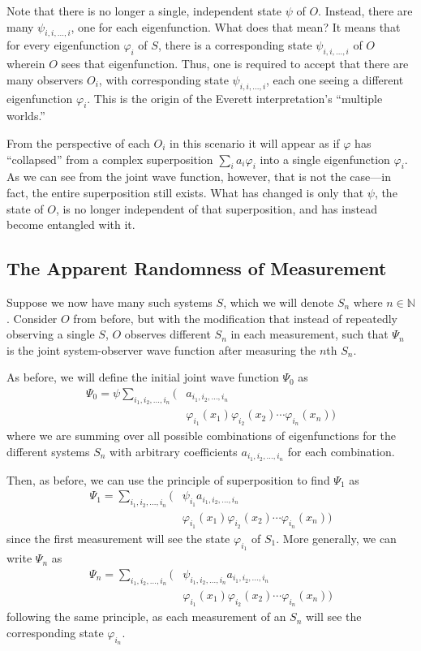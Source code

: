 \documentclass[
    12pt,
    letterpaper,
    aps,
    prd,
    longbibliography,
    twocolumn,
    nofootinbib,
    raggedbottom,
    amsmath,
    amssymb,
    amsfonts,
]{revtex4-1}
\newcommand{\mbb}[1]{\mathbb{#1}}
\renewcommand{\phi}{\varphi}
\begin{document}
Note that there is no longer a single, independent state $\psi$ of $O$. Instead, there are many $\psi_{i,i,\ldots,i}$, one for each eigenfunction. What does that mean? It means that for every eigenfunction $\phi_i$ of $S$, there is a corresponding state $\psi_{i,i,\ldots,i}$ of $O$ wherein $O$ sees that eigenfunction. Thus, one is required to accept that there are many observers $O_i$, with corresponding state $\psi_{i,i,\ldots,i}$, each one seeing a different eigenfunction $\phi_i$. This is the origin of the Everett interpretation's ``multiple worlds.''

From the perspective of each $O_i$ in this scenario it will appear as if $\phi$ has ``collapsed'' from a complex superposition $\sum_i a_i \phi_i$ into a single eigenfunction $\phi_i$. As we can see from the joint wave function, however, that is not the case---in fact, the entire superposition still exists. What has changed is only that $\psi$, the state of $O$, is no longer independent of that superposition, and has instead become entangled with it.

\subsection{The Apparent Randomness of Measurement}

Suppose we now have many such systems $S$, which we will denote $S_n$ where $n \in \mbb N$. Consider $O$ from before, but with the modification that instead of repeatedly observing a single $S$, $O$ observes different $S_n$ in each measurement, such that $\Psi_n$ is the joint system-observer wave function after measuring the $n$th $S_n$.

As before, we will define the initial joint wave function $\Psi_0$ as
\begin{align*}
    \Psi_0 = \psi \sum_{i_1, i_2, \ldots, i_n}\big( & a_{i_1, i_2, \ldots, i_n} \\
    & \phi_{i_1}(x_1) \phi_{i_2}(x_2) \cdots \phi_{i_n}(x_n) \big)
\end{align*}
where we are summing over all possible combinations of eigenfunctions for the different systems $S_n$ with arbitrary coefficients $a_{i_1, i_2, \ldots, i_n}$ for each combination.

Then, as before, we can use the principle of superposition to find $\Psi_1$ as
\begin{align*}
    \Psi_1 = \sum_{i_1, i_2, \ldots, i_n}\big( & \psi_{i_1} a_{i_1, i_2, \ldots, i_n} \\
    & \phi_{i_1}(x_1) \phi_{i_2}(x_2) \cdots \phi_{i_n}(x_n) \big)
\end{align*}
since the first measurement will see the state $\phi_{i_1}$ of $S_1$. More generally, we can write $\Psi_n$ as
\begin{align*}
    \Psi_n = \sum_{i_1, i_2, \ldots, i_n}\big( & \psi_{i_1, i_2, \ldots, i_n} a_{i_1, i_2, \ldots, i_n} \\
    & \phi_{i_1}(x_1) \phi_{i_2}(x_2) \cdots \phi_{i_n}(x_n) \big)
\end{align*}
following the same principle, as each measurement of an $S_n$ will see the corresponding state $\phi_{i_n}$.
\end{document}
